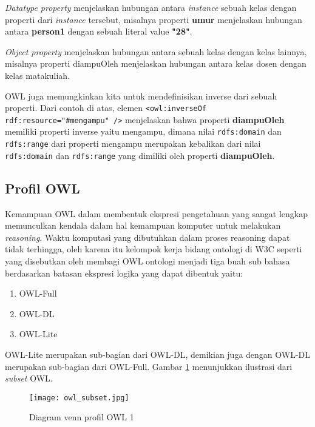\emph{Datatype property} menjelaskan hubungan antara \textit{instance} sebuah kelas dengan properti dari \textit{instance} tersebut, misalnya properti \textbf{umur} menjelaskan hubungan antara \textbf{person1} dengan sebuah literal value \textbf{"28"}. 


\emph{Object property} menjelaskan hubungan antara sebuah kelas dengan kelas lainnya, misalnya properti diampuOleh menjelaskan hubungan antara kelas dosen dengan kelas matakuliah. 


OWL juga memungkinkan kita untuk mendefinisikan inverse dari sebuah properti. Dari contoh di atas, elemen \texttt{<owl:inverseOf rdf:resource="\#mengampu" />} menjelaskan bahwa properti \textbf{diampuOleh} memiliki properti inverse yaitu mengampu, dimana nilai \texttt{rdfs:domain} dan \texttt{rdfs:range} dari properti mengampu merupakan kebalikan dari nilai \texttt{rdfs:domain} dan \texttt{rdfs:range} yang dimiliki oleh properti \textbf{diampuOleh}.

\subsection{Profil OWL}
Kemampuan OWL dalam membentuk ekspresi pengetahuan yang sangat lengkap memunculkan kendala dalam hal kemampuan komputer untuk melakukan \emph{reasoning}. Waktu komputasi yang dibutuhkan dalam proses reasoning dapat tidak terhingga, oleh karena itu kelompok kerja bidang ontologi di W3C seperti yang disebutkan oleh \citet*{mcguinness_vanharmelen} membagi OWL ontologi menjadi tiga buah sub bahasa berdasarkan batasan ekspresi logika yang dapat dibentuk yaitu:
\begin{enumerate}
	\item OWL-Full
	\item OWL-DL
	\item OWL-Lite
\end{enumerate}
OWL-Lite merupakan sub-bagian dari OWL-DL, demikian juga dengan OWL-DL merupakan sub-bagian dari OWL-Full. Gambar \ref{fig:owl_subset} menunjukkan ilustrasi dari \emph{subset} OWL.

\begin{figure}[t]
	\centering
	\texttt{[image: owl\_subset.jpg]}
	\caption{Diagram venn profil OWL 1}
	\label{fig:owl_subset}
\end{figure}

